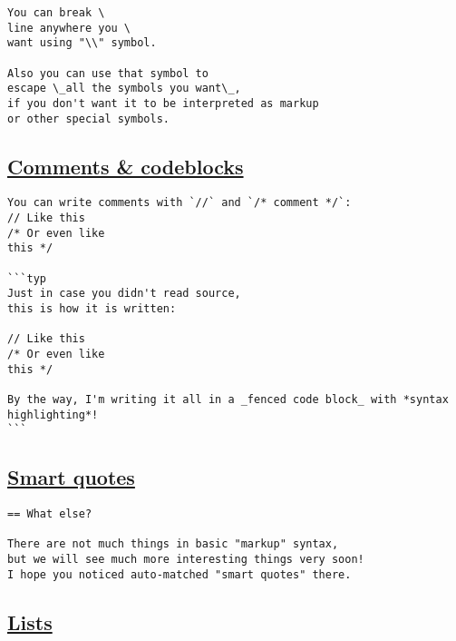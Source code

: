 \begin{verbatim}
You can break \
line anywhere you \
want using "\\" symbol.

Also you can use that symbol to
escape \_all the symbols you want\_,
if you don't want it to be interpreted as markup
or other special symbols.
\end{verbatim}

\pandocbounded{}

\subsection{\texorpdfstring{\hyperref[comments--codeblocks]{Comments \&
codeblocks}}{Comments \& codeblocks}}\label{comments--codeblocks}

\begin{verbatim}
You can write comments with `//` and `/* comment */`:
// Like this
/* Or even like
this */

```typ
Just in case you didn't read source,
this is how it is written:

// Like this
/* Or even like
this */

By the way, I'm writing it all in a _fenced code block_ with *syntax highlighting*!
```
\end{verbatim}

\pandocbounded{}

\subsection{\texorpdfstring{\hyperref[smart-quotes]{Smart
quotes}}{Smart quotes}}\label{smart-quotes}

\begin{verbatim}
== What else?

There are not much things in basic "markup" syntax,
but we will see much more interesting things very soon!
I hope you noticed auto-matched "smart quotes" there.
\end{verbatim}

\pandocbounded{}

\subsection{\texorpdfstring{\hyperref[lists]{Lists}}{Lists}}\label{lists}

